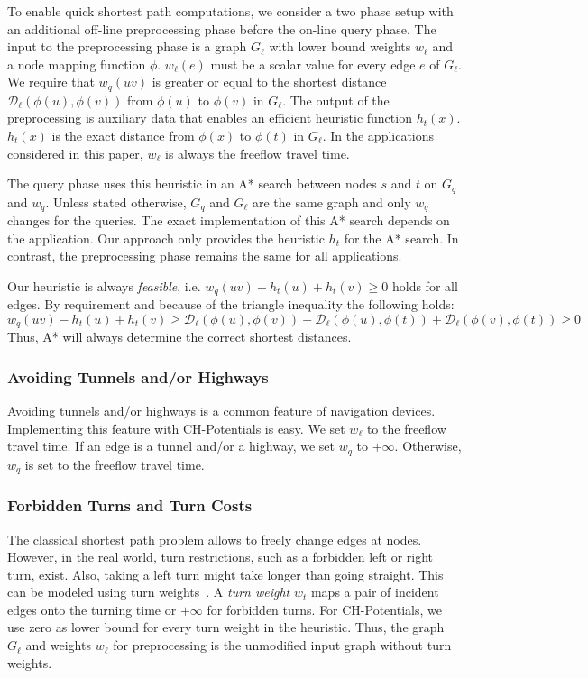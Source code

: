\documentclass[manuscript,review]{acmart}
\newcommand*{\dist}{\mathcal{D}}
\begin{document}
To enable quick shortest path computations, we consider a two phase setup with an additional off-line preprocessing phase before the on-line query phase.
The input to the preprocessing phase is a graph $G_\ell$ with lower bound weights $w_\ell$ and a node mapping function $\phi$.
$w_\ell(e)$ must be a scalar value for every edge $e$ of $G_\ell$.
We require that $w_q(u v)$ is greater or equal to the shortest distance $\dist_\ell(\phi(u), \phi(v))$ from $\phi(u)$ to $\phi(v)$ in $G_\ell$. %
The output of the preprocessing is auxiliary data that enables an efficient heuristic function $h_t(x)$.
$h_t(x)$ is the exact distance from $\phi(x)$ to $\phi(t)$ in $G_\ell$.
In the applications considered in this paper, $w_\ell$ is always the freeflow travel time.

The query phase uses this heuristic in an A* search between nodes $s$ and $t$ on $G_q$ and $w_q$.
Unless stated otherwise, $G_q$ and $G_\ell$ are the same graph and only $w_q$ changes for the queries.
The exact implementation of this A* search depends on the application.
Our approach only provides the heuristic $h_t$ for the A* search.
In contrast, the preprocessing phase remains the same for all applications.

Our heuristic is always \emph{feasible}, i.e. $w_q(u v) - h_t(u) + h_t(v) \geq 0$ holds for all edges.
By requirement and because of the triangle inequality the following holds:
\[
w_q(u v) - h_t(u) + h_t(v) \geq \dist_\ell(\phi(u), \phi(v)) - \dist_\ell(\phi(u), \phi(t)) + \dist_\ell(\phi(v), \phi(t)) \geq 0
\]
Thus, A* will always determine the correct shortest distances.

\subsubsection{Avoiding Tunnels and/or Highways}
\label{sec:no-tunnel-highway}

Avoiding tunnels and/or highways is a common feature of navigation devices.
Implementing this feature with CH-Potentials is easy.
We set $w_\ell$ to the freeflow travel time.
If an edge is a tunnel and/or a highway, we set $w_q$ to $+\infty$.
Otherwise, $w_q$ is set to the freeflow travel time.

\subsubsection{Forbidden Turns and Turn Costs}
\label{sec:no-turns}

The classical shortest path problem allows to freely change edges at nodes.
However, in the real world, turn restrictions, such as a forbidden left or right turn, exist.
Also, taking a left turn might take longer than going straight.
This can be modeled using turn weights~\cite{gv-errnt-11,dgpw-crprn-13,bwzz-cchtc-20}.
A \emph{turn weight} $w_t$ maps a pair of incident edges onto the turning time or $+\infty$ for forbidden turns.
For CH-Potentials, we use zero as lower bound for every turn weight in the heuristic.
Thus, the graph $G_\ell$ and weights $w_\ell$ for preprocessing is the unmodified input graph without turn weights.
\end{document}
